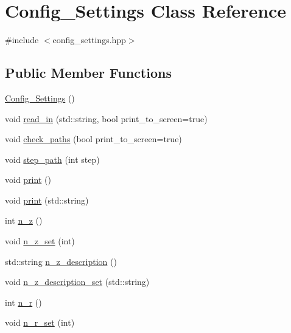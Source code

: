 \hypertarget{class_config___settings}{}\section{Config\+\_\+\+Settings Class Reference}
\label{class_config___settings}


{\ttfamily \#include $<$config\+\_\+settings.\+hpp$>$}

\subsection*{Public Member Functions}
\begin{DoxyCompactItemize}
\item 
\hyperlink{class_config___settings_afe5c14778eaa36a9559977d54a7fda72}{Config\+\_\+\+Settings} ()
\item 
void \hyperlink{class_config___settings_a5896509ff0479fc36acc1319d6ada608}{read\+\_\+in} (std\+::string, bool print\+\_\+to\+\_\+screen=true)
\item 
void \hyperlink{class_config___settings_a3421f43e3bfdd8c6429dfde9887230d8}{check\+\_\+paths} (bool print\+\_\+to\+\_\+screen=true)
\item 
void \hyperlink{class_config___settings_a3cf126c084e23db42100780e17651716}{step\+\_\+path} (int step)
\item 
void \hyperlink{class_config___settings_adf2afd6d78d715587922166b19cfe82f}{print} ()
\item 
void \hyperlink{class_config___settings_a6224a7b0a59a3735a873b77ed53282cf}{print} (std\+::string)
\item 
int \hyperlink{class_config___settings_a52cbe7c286ed9f09296e68524448ff08}{n\+\_\+z} ()
\item 
void \hyperlink{class_config___settings_ad66bf0d9dcee30cc0b970bf4402c4c00}{n\+\_\+z\+\_\+set} (int)
\item 
std\+::string \hyperlink{class_config___settings_a6c7f32979e0adf05130e86f70fc1d168}{n\+\_\+z\+\_\+description} ()
\item 
void \hyperlink{class_config___settings_ab4c3fe0409ce136e3b19ff6898e6e1e8}{n\+\_\+z\+\_\+description\+\_\+set} (std\+::string)
\item 
int \hyperlink{class_config___settings_ae71c4b873c05bfba67d92929adf817b1}{n\+\_\+r} ()
\item 
void \hyperlink{class_config___settings_a5af852f7b2e6b4bd5b76efa408906e58}{n\+\_\+r\+\_\+set} (int)
\item 

\end{DoxyCompactItemize}
